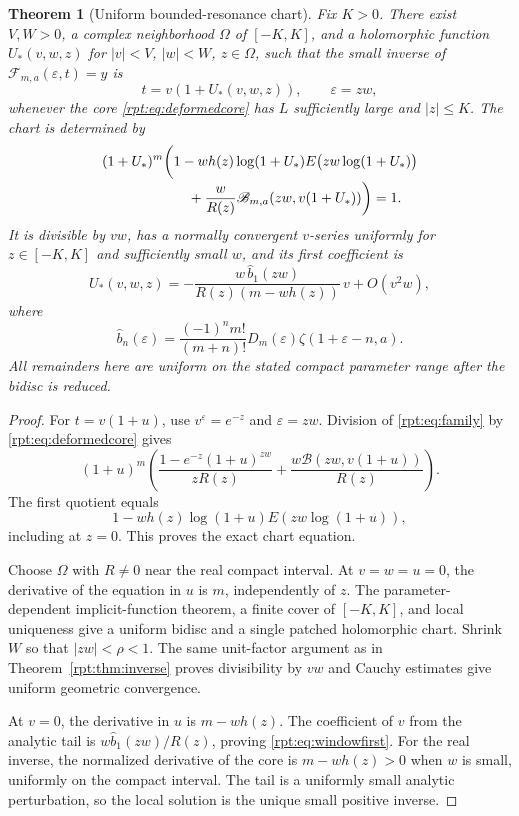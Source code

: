 \documentclass[11pt,a4paper]{article}
\numberwithin{equation}{section}
\newtheorem{theorem}{Theorem}[section]
\theoremstyle{definition}\newtheorem{definition}[theorem]{Definition}
\theoremstyle{remark}\newtheorem{remark}[theorem]{Remark}
\newcommand{\eps}{\varepsilon}
\newcommand{\calF}{\mathscr F}
\newcommand{\calB}{\mathscr B}
\begin{document}
\begin{theorem}[Uniform bounded-resonance chart]
\label{rpt:thm:window}
Fix $K>0$. There exist $V,W>0$, a complex neighborhood $\Omega$ of $[-K,K]$, and a holomorphic function $U_*(v,w,z)$ for $|v|<V$, $|w|<W$, $z\in\Omega$, such that the small inverse of $\calF_{m,a}(\eps,t)=y$ is
\[
t=v(1+U_*(v,w,z)),\qquad \eps=zw,
\]
whenever the core \eqref{rpt:eq:deformedcore} has $L$ sufficiently large and $|z|\le K$. The chart is determined by
\begin{align}
(1+U_*)^m\biggl(&1-w h(z)\log(1+U_*)
 E\bigl(zw\log(1+U_*)\bigr)
\notag\\[-2pt]
&\quad+\frac{w}{R(z)}\calB_{m,a}(zw,v(1+U_*))\biggr)=1.
\label{rpt:eq:windowchart}
\end{align}
It is divisible by $vw$, has a normally convergent $v$-series uniformly for $z\in[-K,K]$ and sufficiently small $w$, and its first coefficient is
\begin{equation}
U_*(v,w,z)=
-\frac{w\,\widehat b_1(zw)}{R(z)(m-wh(z))}\,v+O(v^2w),
\label{rpt:eq:windowfirst}
\end{equation}
where
\[
\widehat b_n(\eps)=\frac{(-1)^n m!}{(m+n)!}D_m(\eps)\zeta(1+\eps-n,a).
\]
All remainders here are uniform on the stated compact parameter range after the bidisc is reduced.
\end{theorem}
\begin{proof}
For $t=v(1+u)$, use $v^\eps=e^{-z}$ and $\eps=zw$. Division of \eqref{rpt:eq:family} by \eqref{rpt:eq:deformedcore} gives
\[
(1+u)^m\left(\frac{1-e^{-z}(1+u)^{zw}}{zR(z)}
 +\frac{w\calB(zw,v(1+u))}{R(z)}\right).
\]
The first quotient equals
\[
1-w h(z)\log(1+u)E(zw\log(1+u)),
\]
including at $z=0$. This proves the exact chart equation.

Choose $\Omega$ with $R\ne0$ near the real compact interval. At $v=w=u=0$, the derivative of the equation in $u$ is $m$, independently of $z$. The parameter-dependent implicit-function theorem, a finite cover of $[-K,K]$, and local uniqueness give a uniform bidisc and a single patched holomorphic chart. Shrink $W$ so that $|zw|<\rho<1$. The same unit-factor argument as in Theorem~\ref{rpt:thm:inverse} proves divisibility by $vw$ and Cauchy estimates give uniform geometric convergence.

At $v=0$, the derivative in $u$ is $m-wh(z)$. The coefficient of $v$ from the analytic tail is $w\widehat b_1(zw)/R(z)$, proving \eqref{rpt:eq:windowfirst}. For the real inverse, the normalized derivative of the core is $m-wh(z)>0$ when $w$ is small, uniformly on the compact interval. The tail is a uniformly small analytic perturbation, so the local solution is the unique small positive inverse.
\end{proof}
\end{document}
